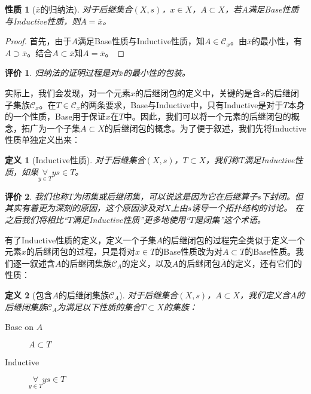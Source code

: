 \documentclass[oneside, 12pt]{ctexart}
\newtheorem{definition}{定义}[section]
\newtheorem{property}{性质}[section]
\newtheorem{remark}{评价}[section]
\begin{document}
\begin{property}[$\overline{x}$的归纳法]
	对于后继集合$(X, s)$，$x \in X$，$A \subset X$，若$A$满足Base性质与Inductive性质，则$A = \overline{x}$。
\end{property}

\begin{proof}
	首先，由于$A$满足Base性质与Inductive性质，知$A \in \mathcal{C}_x$。由$\overline{x}$的最小性，有$A \supset \overline{x}$。结合$A \subset \overline{x}$知$A = \overline{x}$。
\end{proof}

\begin{remark}
	归纳法的证明过程是对$\overline{x}$的最小性的包装。
\end{remark}

实际上，我们会发现，对一个元素$x$的后继闭包的定义中，关键的是含$x$的后继闭子集族$\mathcal{C}_x$。在$T \in \mathcal{C}_x$的两条要求，Base与Inductive中，只有Inductive是对于$T$本身的一个性质，Base用于保证$x$在$T$中。因此，我们可以将一个元素的后继闭包的概念，拓广为一个子集$A \subset X$的后继闭包的概念。为了便于叙述，我们先将Inductive性质单独定义出来：

\begin{definition}[Inductive性质]
	对于后继集合$(X, s)$，$T \subset X$，我们称$T$满足Inductive性质，如果$\mathop{\forall}\limits_{y \in T} ys \in T$。
\end{definition}

\begin{remark}
	我们也称$T$为闭集或后继闭集，可以说这是因为它在后继算子$s$下封闭。但其实有着更为深刻的原因，这个原因涉及对$X$上由$s$诱导一个拓扑结构的讨论。
	在之后我们将相比“$T$满足Inductive性质”更多地使用“$T$是闭集”这个术语。
\end{remark}

有了Inductive性质的定义，定义一个子集$A$的后继闭包的过程完全类似于定义一个元素$x$的后继闭包的过程，只是将对$x \in T$的Base性质改为对$A \subset T$的Base性质。我们逐一叙述含$A$的后继闭集族$\mathcal{C}_A$的定义，以及$A$的后继闭包$\overline{A}$的定义，还有它们的性质：

\begin{definition}[包含$A$的后继闭集族$\mathcal{C}_A$]
	对于后继集合$(X, s)$，$A \subset X$，我们定义含$A$的后继闭集族$\mathcal{C}_A$为满足以下性质的集合$T \subset X$的集族：
	\begin{description}
		\item[Base on $A$] $A \subset T$
		\item[Inductive] $\mathop{\forall}\limits_{y \in T} ys \in T$
	\end{description}
\end{definition}
\end{document}
